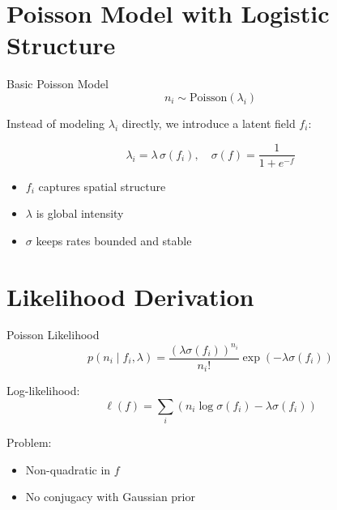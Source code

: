 \documentclass[11pt]{beamer}
\begin{document}






\section{Poisson Model with Logistic Structure}

\begin{frame}{Basic Poisson Model}
\[
n_i \sim \text{Poisson}(\lambda_i)
\]

Instead of modeling $\lambda_i$ directly,
we introduce a latent field $f_i$:

\[
\lambda_i = \lambda \, \sigma(f_i),
\quad
\sigma(f) = \frac{1}{1+e^{-f}}
\]

\begin{itemize}
\item $f_i$ captures spatial structure
\item $\lambda$ is global intensity
\item $\sigma$ keeps rates bounded and stable
\end{itemize}
\end{frame}


\section{Likelihood Derivation}

\begin{frame}{Poisson Likelihood}
\[
p(n_i \mid f_i,\lambda)
=
\frac{(\lambda \sigma(f_i))^{n_i}}{n_i!}
\exp(-\lambda \sigma(f_i))
\]

Log-likelihood:
\[
\ell(f)
=
\sum_i
\left(
n_i \log \sigma(f_i)
-
\lambda \sigma(f_i)
\right)
\]


Problem:
\begin{itemize}
\item Non-quadratic in $f$
\item No conjugacy with Gaussian prior
\end{itemize}
\end{frame}
\end{document}
